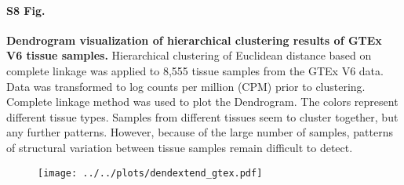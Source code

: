 \documentclass[10pt,letterpaper]{article}
\begin{document}
\paragraph*{S8 Fig.}

\label{figS8}
{\bf Dendrogram visualization of hierarchical clustering results of GTEx V6 tissue samples.} Hierarchical clustering of Euclidean distance based on complete linkage was applied to 8,555 tissue samples from the GTEx V6 data. Data was transformed to log counts per million (CPM) prior to clustering. Complete linkage method was used to plot the Dendrogram. The colors represent different tissue types. Samples from different tissues seem to cluster together, but any further patterns. However, because of the large number of samples, patterns of structural variation between tissue samples remain difficult to detect.
\begin{figure}[ht]
\centering
\texttt{[image: ../../plots/dendextend\_gtex.pdf]}
\end{figure}
\end{document}
